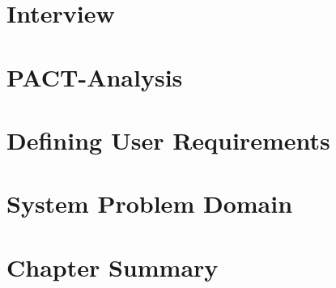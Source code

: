 

\section{Interview}
\label{interview}


\section{PACT-Analysis}
\label{PACT}


\section{Defining User Requirements}
\label{user_requirements}


\section{System Problem Domain}
\label{probem_domain}


\newpage\section{Chapter Summary}
\label{intro_summary}
